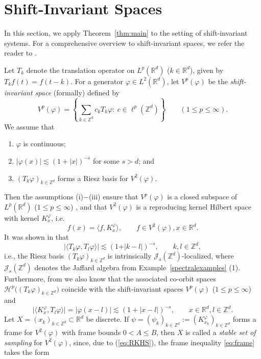 \documentclass{amsart}
\def\Hil{\mathcal{H}}
\newcommand{\R}[0]{{\mathbb{R}}}
\newcommand{\Z}[0]{{\mathbb{Z}}}
\newcommand{\J}[0]{{\mathcal{J}}}
\begin{document}
\section{Shift-Invariant Spaces}\label{Shift-Invariant Spaces}

In this section, we apply Theorem~\ref{thm:main} to the setting of shift-invariant systems. For a comprehensive overview to shift-invariant spaces, we refer the reader to \cite{aldroubi}.

Let $T_k$ denote the translation operator on $L^p(\mathbb{R}^d)$ ($k\in \mathbb{R}^d$), given by $T_k f(t) = f(t-k)$. For a generator $\varphi\in L^2(\R^d)$, let $V^p(\varphi)$ be the \textit{shift-invariant space} (formally) defined by
$$V^p(\varphi)=\left\{\sum_{k\in\Z^d}c_k T_k\varphi:\ c\in \ell^p(\Z^d)\right\} \qquad (1\leq p\leq \infty).$$
We assume that 
\begin{enumerate}
    \item[(i)] $\varphi $ is continuous;
    \item[(ii)] $|\varphi(x)|\lesssim (1+|x|)^{-s}$ for some $s>d$; and
    \item[(iii)] $(T_k\varphi)_{k\in \Z^d}$ forms a Riesz basis for $V^2(\varphi)$.
\end{enumerate}
Then the assumptions (i)$-$(iii) ensure that $V^p(\varphi)$ is a closed subspace of $L^p(\R^d)$ ($1\leq p\leq \infty$) \cite[Section~4]{groe04}, 
and that $V^2(\varphi)$ is a reproducing kernel Hilbert space with kernel $K_x^\varphi$, i.e.
\begin{equation}\label{eq:RKHS}
f(x)=\langle f,K_x^\varphi\rangle, \qquad f\in V^2(\varphi), x\in \R^d. 
\end{equation}
It was shown in \cite{groe04} that 
$$\vert \langle T_k\varphi, T_l\varphi \rangle \vert \lesssim (1+\vert k-l\vert)^{-s}, \qquad k,l\in \mathbb{Z}^d,$$
i.e., the Riesz basis $(T_k\varphi)_{k\in \Z^d}$ is intrinsically $\J_s(\mathbb{Z}^d)$-localized, where $\J_s(\Z^d)$ denotes the Jaffard algebra from Example~\ref{spectralexamples} (1). Furthermore, from \cite{groe04} we also know that the associated co-orbit spaces $\Hil^p\big((T_k\varphi)_{k\in \mathbb{Z}^d}\big)$ coincide with the shift-invariant spaces $V^p(\varphi)$ ($1\leq p\leq \infty$) 
and 
\begin{equation}\label{polyloc}
\vert \langle K_{x}^\varphi, T_l\varphi \rangle \vert = \vert \varphi(x -l) \vert \lesssim (1+|x-l|)^{-s}, \qquad x\in \mathbb{R}^d,l\in \mathbb{Z}^d.
\end{equation}
Let $X=(x_k)_{k\in\Z^d}\subset\R^d$ be discrete. If $\psi=(\psi_k)_{k\in \Z^d} := (K_{x_k}^\varphi)_{k\in \Z^d}$ forms a frame for $V^2(\varphi)$ with frame bounds $0<A\leq B$, then $X$ is called a \textit{stable set of sampling} for $V^2(\varphi)$, since, due to (\ref{eq:RKHS}), the frame inequality \eqref{eq:frame} takes the form
\end{document}
